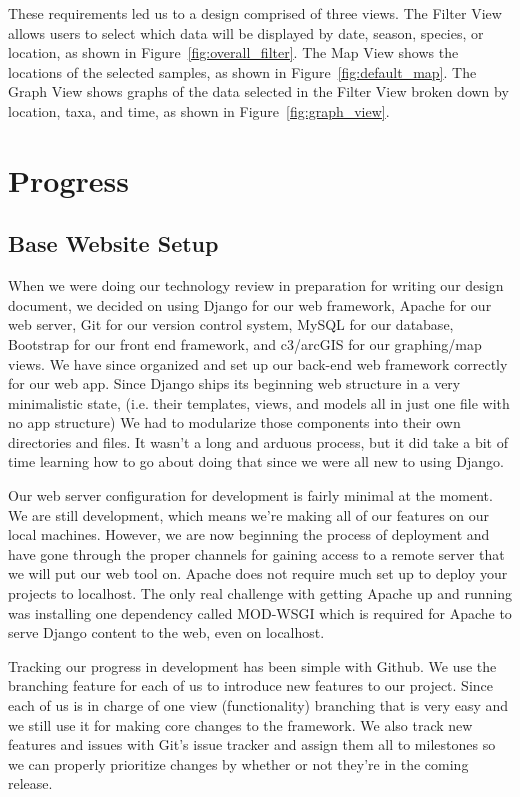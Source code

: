 \documentclass[10pt,draftclsnofoot,onecolumn]{IEEEtran}
\begin{document}
These requirements led us to a design comprised of three views.
The Filter View allows users to select which data will be displayed by date, season, species, or location, as shown in Figure~\ref{fig:overall_filter}.
The Map View shows the locations of the selected samples, as shown in Figure~\ref{fig:default_map}.
The Graph View shows graphs of the data selected in the Filter View broken down by location, taxa, and time, as shown in Figure~\ref{fig:graph_view}.


\section{Progress}

\subsection{Base Website Setup} %
When we were doing our technology review in preparation for writing our design document, we decided on using Django for our web framework, Apache for our web server, Git for our version control system, MySQL for our database, Bootstrap for our front end framework, and c3/arcGIS for our graphing/map views.
We have since organized and set up our back-end web framework correctly for our web app.
Since Django ships its beginning web structure in a very minimalistic state, (i.e. their templates, views, and models all in just one file with no app structure) We had to modularize those components into their own directories and files.
It wasn’t a long and arduous process, but it did take a bit of time learning how to go about doing that since we were all new to using Django.

Our web server configuration for development is fairly minimal at the moment.
We are still development, which means we’re making all of our features on our local machines.
However, we are now beginning the process of deployment and have gone through the proper channels for gaining access to a remote server that we will put our web tool on.
Apache does not require much set up to deploy your projects to localhost.
The only real challenge with getting Apache up and running was installing one dependency called MOD-WSGI which is required for Apache to serve Django content to the web, even on localhost.

Tracking our progress in development has been simple with Github.
We use the branching feature for each of us to introduce new features to our project.
Since each of us is in charge of one view (functionality) branching that is very easy and we still use it for making core changes to the framework.
We also track new features and issues with Git’s issue tracker and assign them all to milestones so we can properly prioritize changes by whether or not they’re in the coming release.
\end{document}
